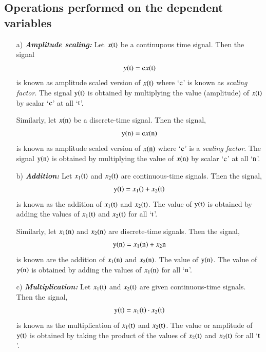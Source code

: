 \subsection{Operations performed on the dependent variables}\label{chap1-subsec-1.5.1}
\begin{itemize}
\item[{\rm a)}]{\it \bfseries Amplitude scaling:} Let $x(\textrm{t})$ be a continupous time signal. Then the signal
\begin{equation}
y({\textrm{t}}) = {\textrm{c}}  x(\textrm{t})\label{chap1-eq-1.26}
\end{equation}
is known as amplitude scaled version of $x ({\textrm{t}})$ where `${\textrm{c}}$' is known as \textit{scaling factor}. The signal $\textrm{y} (\textrm{t})$ is obtained by multiplying the value (amplitude) of $x (\textrm{t})$  by scalar `$\textrm{c}$' at all `$\textrm{t}$'.

Similarly, let $x (\textrm{n})$ be a discrete-time signal. Then the signal,
\begin{equation}
{\textrm{y}} ({\textrm{n}}) = {\textrm{c}} x {(\textrm{n})}\label{chap1-eq-1.27}  
\end{equation}
is known as amplitude scaled version of $x (\textrm{n})$ where `$\textrm{c}$' is a \textit{scaling factor}. The signal $\textrm{y}(\textrm{n})$ is obtained by multiplying the value of $x (\textrm{n})$ by scalar `$\textrm{c}$' at all `$\textrm{n}$'.

\item [{\rm b)}] {\it \bfseries Addition:} Let $x_{1}(\textrm{t})$ and $x_{2}(\textrm{t})$ are continuous-time signals. Then the signal,
\begin{equation}
{\textrm{y}}{(\textrm{t})} = x_{1}{(\rm)} + x_{2}{(\textrm{t})}\label{chap1-eq-1.28}
\end{equation}
is known as the addition of $x_{1}{(\textrm{t})}$ and $x_{2}{(\textrm{t})}$. The value of ${\textrm{y}} {(\textrm{t})}$ is obtained by adding the values of $x_{1}{(\textrm{t})}$ and $x_{2}{(\textrm{t})}$ for all `${\textrm{t}}$'.

Similarly, let $x_{1}{(\textrm{n})}$ and $x_{2}{\rm(n)}$ are discrete-time signals. Then the signal,
\begin{equation}
{\textrm{y}}{(\textrm{n})} = x_{1} {(\textrm{n})} + x_{2}{\textrm{n}}\label{chap1-eq-1.29}
\end{equation}
is known are the addition of $x_{1}{\rm(n)}$ and $x_{2}{\rm(n)}$. The value of ${\textrm{y}}{(\textrm{n})}$. The value of ${\textrm{y}}{(\textrm{n})}$ is obtained by adding the values of $x_{1}{(\textrm{n})}$ for all `${\textrm{n}}$'.

\item[{\rm c)}]{\it \bfseries Multiplication:} Let $x_{1}{(\textrm{t})}$ and $x_{2}{(\textrm{t})}$ are given continuous-time signals. Then the signal,
\begin{equation}
{\textrm{y}}{(\textrm{t})} = x_{1}{(\textrm{t})} \cdot x_{2}{(\textrm{t})}\label{chap1-eq-1.30}
\end{equation}
is known as the multiplication of $x_{1}{(\textrm{t})}$ and $x_{2}{(\textrm{t})}$. The value or amplitude of $\textrm{y}(\textrm{t})$ is obtained by taking the product of the values of $x_{2}(\textrm{t})$ and $x_{2}(\textrm{t})$ for all `$\textrm{t}$'.


\end{itemize}
